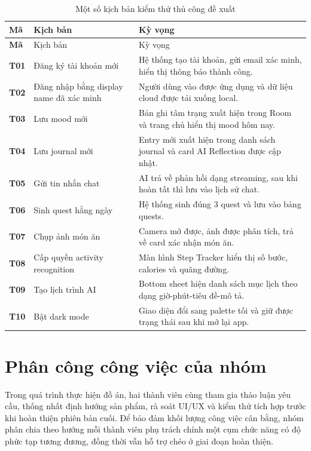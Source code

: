 \documentclass{zenbuddy-report}
\begin{document}
\begin{longtable}{>{\bfseries}p{1.7cm}p{4.1cm}X}
\caption{Một số kịch bản kiểm thử thủ công đề xuất}\label{tab:manual-tests}\\
\toprule
Mã & Kịch bản & Kỳ vọng \\
\midrule
\endfirsthead
\toprule
Mã & Kịch bản & Kỳ vọng \\
\midrule
\endhead
T01 & Đăng ký tài khoản mới & Hệ thống tạo tài khoản, gửi email xác minh, hiển thị thông báo thành công. \\
T02 & Đăng nhập bằng display name đã xác minh & Người dùng vào được ứng dụng và dữ liệu cloud được tải xuống local. \\
T03 & Lưu mood mới & Bản ghi tâm trạng xuất hiện trong Room và trang chủ hiển thị mood hôm nay. \\
T04 & Lưu journal mới & Entry mới xuất hiện trong danh sách journal và card AI Reflection được cập nhật. \\
T05 & Gửi tin nhắn chat & AI trả về phản hồi dạng streaming, sau khi hoàn tất thì lưu vào lịch sử chat. \\
T06 & Sinh quest hằng ngày & Hệ thống sinh đúng 3 quest và lưu vào bảng quests. \\
T07 & Chụp ảnh món ăn & Camera mở được, ảnh được phân tích, trả về card xác nhận món ăn. \\
T08 & Cấp quyền activity recognition & Màn hình Step Tracker hiển thị số bước, calories và quãng đường. \\
T09 & Tạo lịch trình AI & Bottom sheet hiện danh sách mục lịch theo dạng giờ-phút-tiêu đề-mô tả. \\
T10 & Bật dark mode & Giao diện đổi sang palette tối và giữ được trạng thái sau khi mở lại app. \\
\bottomrule
\end{longtable}

\section{Phân công công việc của nhóm}
Trong quá trình thực hiện đồ án, hai thành viên cùng tham gia thảo luận yêu cầu, thống nhất định hướng sản phẩm, rà soát UI/UX và kiểm thử tích hợp trước khi hoàn thiện phiên bản cuối. Để bảo đảm khối lượng công việc cân bằng, nhóm phân chia theo hướng mỗi thành viên phụ trách chính một cụm chức năng có độ phức tạp tương đương, đồng thời vẫn hỗ trợ chéo ở giai đoạn hoàn thiện.
\end{document}
